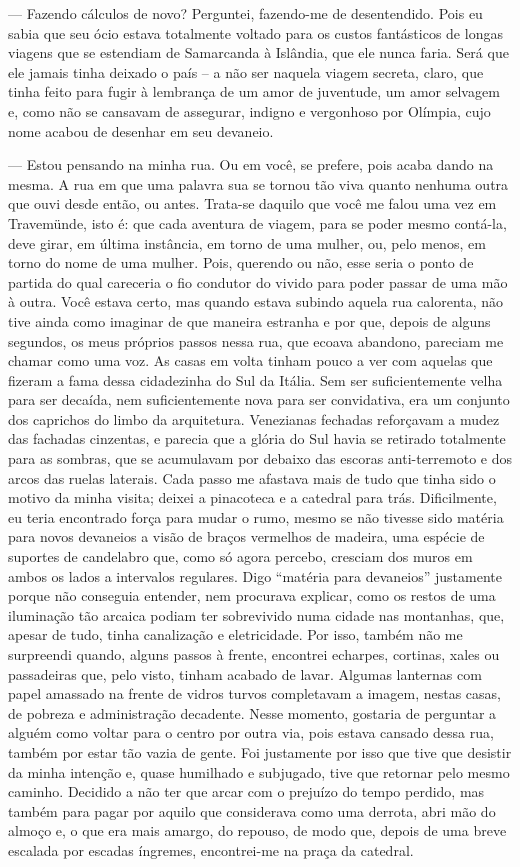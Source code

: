 --- Fazendo cálculos de novo? Perguntei, fazendo-me de desentendido. Pois
eu sabia que seu ócio estava totalmente voltado para os custos
fantásticos de longas viagens que se estendiam de Samarcanda à Islândia,
que ele nunca faria. Será que ele jamais tinha deixado o país -- a não
ser naquela viagem secreta, claro, que tinha feito para fugir à
lembrança de um amor de juventude, um amor selvagem e, como não se
cansavam de assegurar, indigno e vergonhoso por Olímpia, cujo nome
acabou de desenhar em seu devaneio.

--- Estou pensando na minha rua. Ou em você, se prefere, pois acaba dando
na mesma. A rua em que uma palavra sua se tornou tão viva quanto nenhuma
outra que ouvi desde então, ou antes. Trata-se daquilo que você me falou
uma vez em Travemünde, isto é: que cada aventura de viagem, para se
poder mesmo contá-la, deve girar, em última instância, em torno de uma
mulher, ou, pelo menos, em torno do nome de uma mulher. Pois, querendo
ou não, esse seria o ponto de partida do qual careceria o fio condutor
do vivido para poder passar de uma mão à outra. Você estava certo, mas
quando estava subindo aquela rua calorenta, não tive ainda como imaginar
de que maneira estranha e por que, depois de alguns segundos, os meus
próprios passos nessa rua, que ecoava abandono, pareciam me chamar como
uma voz. As casas em volta tinham pouco a ver com aquelas que fizeram a
fama dessa cidadezinha do Sul da Itália. Sem ser suficientemente velha
para ser decaída, nem suficientemente nova para ser convidativa, era um
conjunto dos caprichos do limbo da arquitetura. Venezianas fechadas
reforçavam a mudez das fachadas cinzentas, e parecia que a glória do Sul
havia se retirado totalmente para as sombras, que se acumulavam por
debaixo das escoras anti-terremoto e dos arcos das ruelas laterais. Cada
passo me afastava mais de tudo que tinha sido o motivo da minha visita;
deixei a pinacoteca e a catedral para trás. Dificilmente, eu teria
encontrado força para mudar o rumo, mesmo se não tivesse sido matéria
para novos devaneios a visão de braços vermelhos de madeira, uma espécie
de suportes de candelabro que, como só agora percebo, cresciam dos muros
em ambos os lados a intervalos regulares. Digo ``matéria para
devaneios'' justamente porque não conseguia entender, nem procurava
explicar, como os restos de uma iluminação tão arcaica podiam ter
sobrevivido numa cidade nas montanhas, que, apesar de tudo, tinha
canalização e eletricidade. Por isso, também não me surpreendi quando,
alguns passos à frente, encontrei echarpes, cortinas, xales ou
passadeiras que, pelo visto, tinham acabado de lavar. Algumas lanternas
com papel amassado na frente de vidros turvos completavam a imagem,
nestas casas, de pobreza e administração decadente. Nesse momento,
gostaria de perguntar a alguém como voltar para o centro por outra via,
pois estava cansado dessa rua, também por estar tão vazia de gente. Foi
justamente por isso que tive que desistir da minha intenção e, quase
humilhado e subjugado, tive que retornar pelo mesmo caminho. Decidido a
não ter que arcar com o prejuízo do tempo perdido, mas também para pagar
por aquilo que considerava como uma derrota, abri mão do almoço e, o que
era mais amargo, do repouso, de modo que, depois de uma breve escalada
por escadas íngremes, encontrei-me na praça da catedral.

